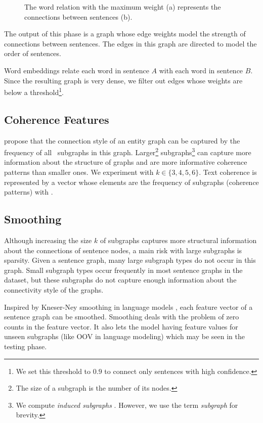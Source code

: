 \begin{figure}[!ht]
\centering
\small
%
\caption{The word relation with the maximum weight (a) represents the connections between sentences (b).}
\label{f:sent_rel}
\end{figure}

The output of this phase is a graph whose edge weights model the
strength of connections between sentences. The edges in this graph are
directed to model the order of sentences.

Word embeddings relate each word in sentence $A$ with each word in
sentence $B$. Since the resulting graph is very dense, we filter
out edges whose weights are below a
threshold\footnote{We set this threshold to $0.9$ to connect only
  sentences with high confidence.}.


\subsection{Coherence Features} 
%
 propose that the connection style of an entity
graph can be captured by the frequency of all \knode\ subgraphs in
this graph. Larger\footnote{The size of a subgraph is the number of
  its nodes.} subgraphs\footnote{We compute \emph{induced
    subgraphs} \cite{mesgar15}. However, we use the term
  \emph{subgraph} for brevity.} can capture more information about the
structure of graphs and are more informative coherence patterns than
smaller ones. We experiment with $k \in \{3,4,5,6\}$. Text coherence is
represented by a vector whose elements are the frequency of subgraphs
(coherence patterns) with \knode.

\subsection{Smoothing} 
% 
Although increasing the size $k$ of subgraphs captures more
structural information about the connections of sentence nodes, a
main risk with large subgraphs is sparsity. Given a sentence graph,
many large subgraph types do not occur in this graph.  Small subgraph
types occur frequently in most sentence graphs in the dataset, but
these subgraphs do not capture enough information about the
connectivity style of the graphs.

Inspired by Kneser-Ney smoothing in language models \cite{heafield13},
each feature vector of a sentence graph can be smoothed. Smoothing
deals with the problem of zero counts in the feature vector.  It also
lets the model having feature values for unseen subgraphs (like OOV in
language modeling) which may be seen in the testing phase.

